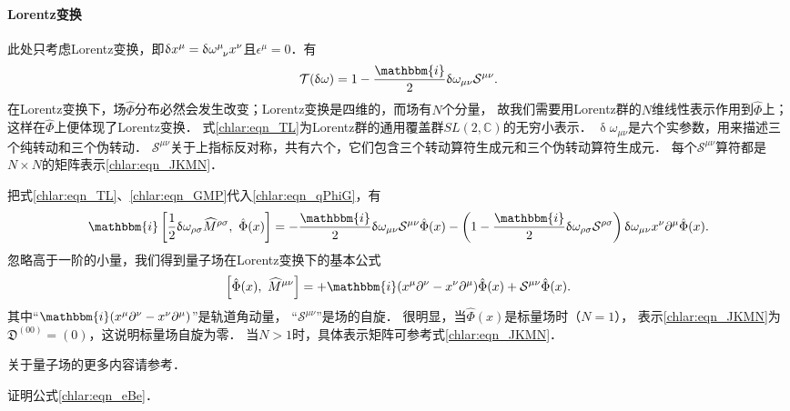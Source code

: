 \paragraph{Lorentz变换}
此处只考虑Lorentz变换，即$\updelta x^\mu= \updelta\omega^\mu_{\hphantom{\mu}\nu}x^\nu$且$\epsilon^\mu=0$．有
\begin{equation}\label{chlar:eqn_TL}
	\mathcal{T}(\updelta\omega)=1-\frac{\mathbbm{i}}{2} \updelta\omega_{\mu\nu} \mathcal{S}^{\mu\nu}.
\end{equation}
在Lorentz变换下，场$\hat{\Phi}$分布必然会发生改变；Lorentz变换是四维的，而场有$N$个分量，
故我们需要用Lorentz群的$N$维线性表示作用到$\hat{\Phi}$上；这样在$\hat{\Phi}$上便体现了Lorentz变换．
式\eqref{chlar:eqn_TL}为Lorentz群的通用覆盖群$SL(2,\mathbb{C})$的无穷小表示．
$\updelta\omega_{\mu\nu}$是六个实参数，用来描述三个纯转动和三个伪转动．
$\mathcal{S}^{\mu\nu}$关于上指标反对称，共有六个，它们包含三个转动算符生成元和三个伪转动算符生成元．
每个$\mathcal{S}^{\mu\nu}$算符都是$N\times N$的矩阵表示\eqref{chlar:eqn_JKMN}．

把式\eqref{chlar:eqn_TL}、\eqref{chlar:eqn_GMP}代入\eqref{chlar:eqn_qPhiG}，有
\begin{align*}
	\mathbbm{i}\left[ \frac{1}{2}\updelta\omega_{\rho\sigma} \widehat{M}^{\rho\sigma},\ \hat{\Phi}(x)\right] = 
	-\frac{\mathbbm{i}}{2} \updelta\omega_{\mu\nu} \mathcal{S}^{\mu\nu} \hat{\Phi}(x)
	-\left(1-\frac{\mathbbm{i}}{2} \updelta\omega_{\rho\sigma} \mathcal{S}^{\rho\sigma}\right)  
	\updelta\omega_{\mu\nu}x^\nu  \partial^{\mu}\hat{\Phi}(x) .
\end{align*}
忽略高于一阶的小量，我们得到量子场在Lorentz变换下的基本公式
\begin{equation}\label{chlar:eqn_Phi-Lorentz}
	\left[\hat{\Phi}(x),\ \widehat{M}^{\mu\nu}\right] = 
	+\mathbbm{i}(x^\mu  \partial^{\nu}-x^\nu  \partial^{\mu})\hat{\Phi}(x)
	+\mathcal{S}^{\mu\nu} \hat{\Phi}(x) .
\end{equation}
其中“$\mathbbm{i}(x^\mu  \partial^{\nu}-x^\nu  \partial^{\mu})$”是轨道角动量，
“$\mathcal{S}^{\mu\nu}$”是场的自旋．
很明显，当$\hat{\Phi}(x)$是标量场时（$N=1$），
表示\eqref{chlar:eqn_JKMN}为$\mathfrak{D}^{(00)} = (0)$，这说明标量场自旋为零．
当$N>1$时，具体表示矩阵可参考式\eqref{chlar:eqn_JKMN}．

关于量子场的更多内容请参考\parencite[\S 5.6,5.7]{weinberg_vol1}．



\begin{example}\label{chlar:exam_eBe}
	证明公式\eqref{chlar:eqn_eBe}．
\end{example}

